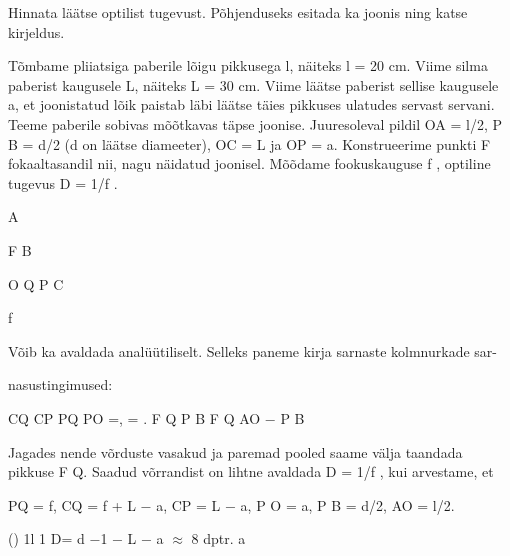 
Hinnata läätse optilist tugevust. Põhjenduseks esitada ka joonis ning katse kirjeldus.

\hint

\solu
Tõmbame pliiatsiga paberile lõigu pikkusega l, näiteks l = 20 cm. Viime silma paberist kaugusele L, näiteks L = 30 cm. Viime läätse paberist sellise kaugusele a, et joonistatud lõik paistab läbi läätse täies pikkuses ulatudes servast servani. Teeme paberile sobivas mõõtkavas täpse joonise. Juuresoleval pildil OA = l/2, P B = d/2 (d on läätse diameeter), OC = L ja OP = a. Konstrueerime punkti F fokaaltasandil nii, nagu näidatud joonisel. Mõõdame fookuskauguse f , optiline tugevus D = 1/f .

A

F B

O Q P C

f

Võib ka avaldada analüütiliselt. Selleks paneme kirja sarnaste kolmnurkade sar-

nasustingimused:

CQ CP PQ PO =, = . F Q P B F Q AO $-$ P B

Jagades nende võrduste vasakud ja paremad pooled saame välja taandada pikkuse F Q. Saadud võrrandist on lihtne avaldada D = 1/f , kui arvestame, et

PQ = f, CQ = f + L $-$ a, CP = L $-$ a, P O = a, P B = d/2, AO = l/2.

() 1l 1 D= d $-$1 $-$ L $-$ a $\approx$ 8 dptr. a
\probend
